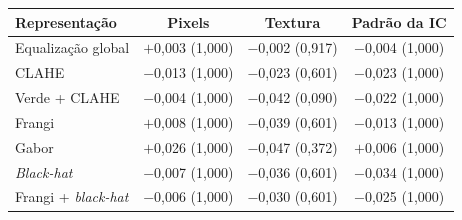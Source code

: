 \begin{tabular}{lccc}
\toprule
Representação & Pixels & Textura & Padrão da IC \\
\midrule
Equalização global & $+$0,003 (1,000) & $-$0,002 (0,917) & $-$0,004 (1,000) \\
CLAHE & $-$0,013 (1,000) & $-$0,023 (0,601) & $-$0,023 (1,000) \\
Verde + CLAHE & $-$0,004 (1,000) & $-$0,042 (0,090) & $-$0,022 (1,000) \\
\midrule
Frangi & $+$0,008 (1,000) & $-$0,039 (0,601) & $-$0,013 (1,000) \\
Gabor & $+$0,026 (1,000) & $-$0,047 (0,372) & $+$0,006 (1,000) \\
\textit{Black-hat} & $-$0,007 (1,000) & $-$0,036 (0,601) & $-$0,034 (1,000) \\
Frangi + \textit{black-hat} & $-$0,006 (1,000) & $-$0,030 (0,601) & $-$0,025 (1,000) \\
\bottomrule
\end{tabular}
